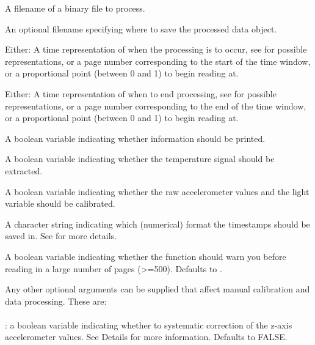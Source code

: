 \documentclass[a4paper]{book}
\begin{document}
\begin{Arguments}
\begin{ldescription}
\item[\code{binfile}] 
A filename of a binary file to process.

\item[\code{outfile}] 
An optional filename specifying where to save the processed data object.

\item[\code{start}] Either:
A time representation of when the processing is to occur, see  for possible representations, or 
a page number corresponding to the start of the time window, or
a proportional point (between 0 and 1) to begin reading at.

\item[\code{end}] Either:
A time representation of when to end processing, see  for possible representations, or 
a page number corresponding to the end of the time window, or
a proportional point (between 0 and 1) to begin reading at.

\item[\code{verbose}] 
A boolean variable indicating whether information should be printed.

\item[\code{do.temp}] 
A boolean variable indicating whether the temperature signal should be extracted.

\item[\code{calibrate}] 
A boolean variable indicating whether the raw accelerometer values and the light variable should be calibrated.

\item[\code{tformat}] 
A character string indicating which (numerical) format the timestamps should be saved in.  See  for more details.

\item[\code{warn}] 
A boolean variable indicating whether the function should warn you before reading in a large number of pages (>=500).  Defaults to .

\item[\code{...}] Any other optional arguments can be supplied that affect manual calibration and data processing.  These are: \\{}\\{}
: a boolean variable indicating whether to systematic correction of the z-axis accelerometer values.  See Details for more information.  Defaults to FALSE.\\{}


\end{ldescription}
\end{Arguments}
\end{document}
